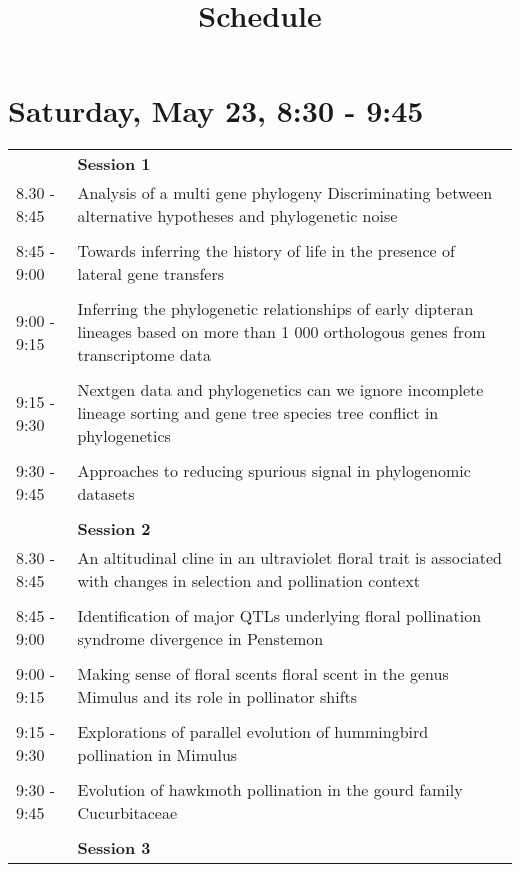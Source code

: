 \documentclass{article}
\title{Schedule}
\date{}
\begin{document}
\maketitle

\section{Saturday, May 23, 8:30 - 9:45}
\begin{longtabu} to \textwidth {lX}
 & \textbf{Session 1} \\ 

8.30 - 8:45 & Analysis of a multi gene phylogeny  Discriminating between alternative hypotheses and phylogenetic noise \\ 
 &  \\ 
8:45 - 9:00 & Towards inferring the history of life in the presence of lateral gene transfers \\ 
 &  \\ 
9:00 - 9:15 & Inferring the phylogenetic relationships of early dipteran lineages based on more than 1 000 orthologous genes from transcriptome data \\ 
 &  \\ 
9:15 - 9:30 & Nextgen data and phylogenetics   can we ignore incomplete lineage sorting and gene tree species tree conflict in phylogenetics \\ 
 &  \\ 
9:30 - 9:45 & Approaches to reducing spurious signal in phylogenomic datasets \\ 
 &  \\ 
 & \textbf{Session 2} \\ 

8.30 - 8:45 & An altitudinal cline in an ultraviolet floral trait is associated with changes in selection and pollination context \\ 
 &  \\ 
8:45 - 9:00 & Identification of major QTLs underlying floral pollination syndrome divergence in Penstemon \\ 
 &  \\ 
9:00 - 9:15 & Making sense of floral scents  floral scent in the genus Mimulus and its role in pollinator shifts \\ 
 &  \\ 
9:15 - 9:30 & Explorations of parallel evolution of hummingbird pollination in Mimulus \\ 
 &  \\ 
9:30 - 9:45 & Evolution of hawkmoth pollination in the gourd family  Cucurbitaceae \\ 
 &  \\ 
 & \textbf{Session 3} \\ 


\end{longtabu}
\end{document}

